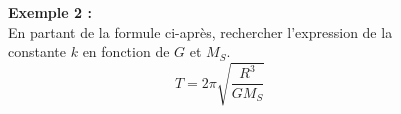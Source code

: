 \documentclass[a4paper,12pt,fleqn]{scrartcl}%
\begin{document}
 
	\begin{figure}[h!]
	\begin{tcolorbox}[arc=1ex, colframe=black, left=3pt, right=3pt, top=3pt, bottom=2pt]
	\textbf{Exemple 2 :}\\
	En partant de la formule ci-après, rechercher l'expression de la constante $k$ en fonction de $G$ et $M_S$.
	$$	T=2 \pi \sqrt{\dfrac{R^3}{GM_S}} $$
	\end{tcolorbox}	
	\end{figure}

 
\end{document}
